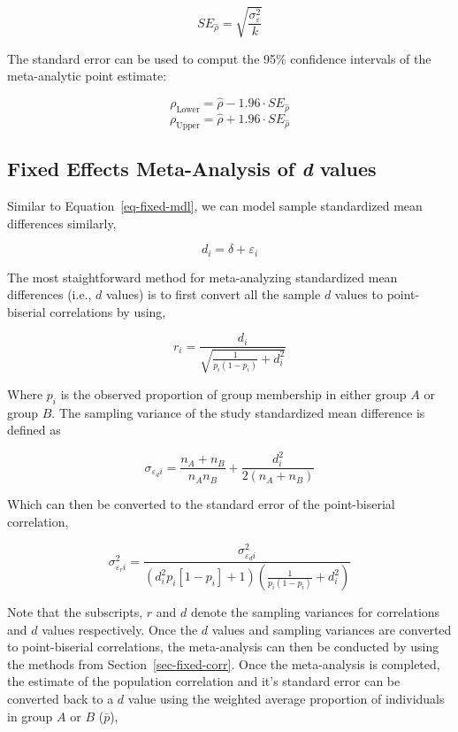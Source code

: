 \documentclass[
  letterpaper,
  DIV=11,
  numbers=noendperiod]{scrreprt}
\begin{document}
\[
SE_\hat{\rho} = \sqrt{\frac{\sigma^2_{\varepsilon}}{k}}
\]

The standard error can be used to comput the 95\% confidence intervals
of the meta-analytic point estimate:

\[
\rho_{\text{Lower}} = \hat{\rho}- 1.96 \cdot SE_\hat{\rho}
\] \[
\rho_{\text{Upper}} = \hat{\rho}+ 1.96\cdot SE_\hat{\rho}
\]

\hypertarget{fixed-effects-meta-analysis-of-d-values}{%
\subsection{\texorpdfstring{Fixed Effects Meta-Analysis of \emph{d}
values}{Fixed Effects Meta-Analysis of d values}}\label{fixed-effects-meta-analysis-of-d-values}}

Similar to Equation~\ref{eq-fixed-mdl}, we can model sample standardized
mean differences similarly,

\[
d_i = \delta + \varepsilon_i
\]

The most staightforward method for meta-analyzing standardized mean
differences (i.e., \(d\) values) is to first convert all the sample
\(d\) values to point-biserial correlations by using,

\[
r_i = \frac{d_i}{\sqrt{\frac{1}{p_i(1-p_i)}+d_i^2}}
\]

Where \(p_i\) is the observed proportion of group membership in either
group \(A\) or group \(B\). The sampling variance of the study
standardized mean difference is defined as

\[
\sigma_{\varepsilon_di} = \frac{n_A+n_B}{n_A n_B} + \frac{d_i^2}{2(n_A+n_B)}
\]

Which can then be converted to the standard error of the point-biserial
correlation,

\[
\sigma^2_{\varepsilon_ri} =\frac{\sigma_{\varepsilon_di}^2}{\left(d_i^2p_i[1-p_i]+1\right)\left(\frac{1}{p_i(1-p_i)}+d_i^2\right)}
\]

Note that the subscripts, \(r\) and \(d\) denote the sampling variances
for correlations and \(d\) values respectively. Once the \(d\) values
and sampling variances are converted to point-biserial correlations, the
meta-analysis can then be conducted by using the methods from
Section~\ref{sec-fixed-corr}. Once the meta-analysis is completed, the
estimate of the population correlation and it's standard error can be
converted back to a \(d\) value using the weighted average proportion of
individuals in group \(A\) or \(B\) (\(\bar{p}\)),
\end{document}
